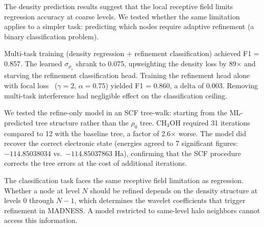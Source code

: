 The density prediction results suggest that the local receptive field
limits regression accuracy at coarse levels. We tested whether the same
limitation applies to a simpler task: predicting which nodes require
adaptive refinement (a binary classification problem).

Multi-task training (density regression + refinement classification)
achieved F1 = 0.857. The learned $\sigma_{\rho_s}$ shrank to 0.075,
upweighting the density loss by 89$\times$ and starving the refinement
classification head. Training the refinement head alone with focal
loss~\cite{lin2017focal} ($\gamma = 2$, $\alpha = 0.75$) yielded
F1 = 0.860, a delta of 0.003. Removing multi-task interference had
negligible effect on the classification ceiling.

We tested the refine-only model in an SCF tree-walk: starting from
the ML-predicted tree structure rather than the $\rho_0$ tree.
CH$_3$OH required 31 iterations compared to 12 with the baseline
tree, a factor of 2.6$\times$ worse. The model did recover the
correct electronic state (energies agreed to 7 significant figures:
$-114.85038034$ vs.\ $-114.85037863$ Ha), confirming that the SCF
procedure corrects the tree errors at the cost of additional
iterations.

The classification task faces the same receptive field limitation
as regression. Whether a node at level $N$ should be refined depends
on the density structure at levels 0 through $N-1$, which determines
the wavelet coefficients that trigger refinement in MADNESS. A model
restricted to same-level halo neighbors cannot access this information.
